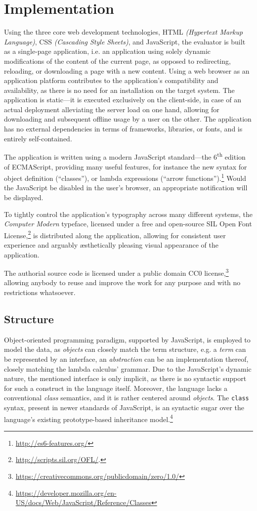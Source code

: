 \documentclass[table, a4paper, 10pt]{article}
\begin{document}
\newpage
\section{Implementation}
Using the three core web development technologies,
HTML \textit{(Hypertext Markup Language)}, CSS \textit{(Cascading Style Sheets)}, and JavaScript,
the evaluator is built as a single-page application,
i.e. an application using solely dynamic modifications of the content of the current page,
as opposed to redirecting, reloading, or downloading a page with a new content.
Using a web browser as an application platform contributes
to the application's compatibility and availability, 
as there is no need for an installation on the target system.
The application is static---it is executed exclusively on the client-side,
in case of an actual deployment alleviating the server load on one hand,
allowing for downloading and subsequent offline usage by a user on the other.
The application has no external dependencies in terms of frameworks, libraries, or
fonts, and is entirely self-contained.

The application is written using a modern JavaScript standard---the 6\textsuperscript{th} edition of ECMAScript,
providing many useful features, for instance the new syntax for object definition (``classes''), or
lambda expressions (``arrow functions'').\footnote{\url{http://es6-features.org/}}
Would the JavaScript be disabled in the user's browser, an appropriate notification will be displayed.

To tightly control the application's typography across many different systems,
the \textit{Computer Modern} typeface, licensed under a free and open-source SIL
Open Font License,\footnote{\url{http://scripts.sil.org/OFL/}.}
is distributed along the application, allowing
for consistent user experience and arguably {\ae}sthetically pleasing visual appearance of the application.

The authorial source code is licensed under a public
domain CC0 license,\footnote{\url{https://creativecommons.org/publicdomain/zero/1.0/}}
allowing anybody to reuse and improve the work for any purpose and with no restrictions whatsoever.

\subsection{Structure}
Object-oriented programming paradigm, supported by JavaScript, is employed
to model the data, as \textit{objects} can closely match the term structure,
e.g. a \textit{term} can be represented by an interface, an \textit{abstraction} can
be an implementation thereof, closely matching the lambda calculus' grammar.
Due to the JavaScript's dynamic nature, the mentioned interface is only implicit,
as there is no syntactic support for such a construct in the language itself.
Moreover, the language lacks a conventional \textit{class} semantics, and
it is rather centered around \textit{objects}. The \texttt{class} syntax,
present in newer standards of JavaScript, is
an syntactic sugar over the language's existing prototype-based
inheritance model.\footnote{\url{https://developer.mozilla.org/en-US/docs/Web/JavaScript/Reference/Classes}}
\end{document}
